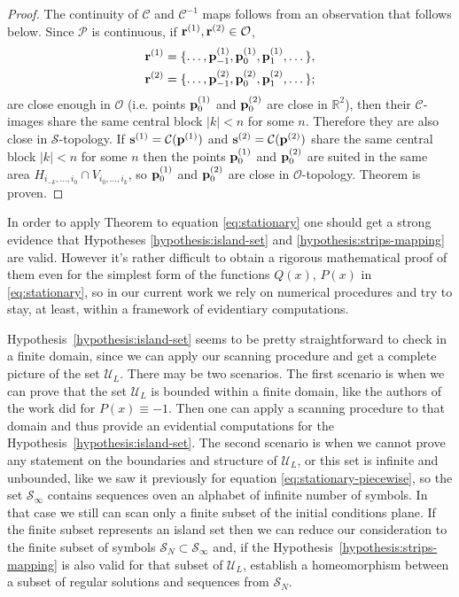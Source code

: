 \begin{proof}
	The continuity of $\mathcal{C}$ and $\mathcal{C}^{-1}$ maps follows from an observation that follows below.
	Since $\mathcal{P}$ is continuous, if $\vb{r}^{(1)}, \vb{r}^{(2)} \in \mathcal{O}$,
	\begin{eqnarray*}
		& \vb{r}^{(1)} = \{ \dots, \vb{p}_{-1}^{(1)}, \vb{p}_0^{(1)}, \vb{p}_1^{(1)}, \dots \}, \\
		& \vb{r}^{(2)} = \{ \dots, \vb{p}_{-1}^{(2)}, \vb{p}_0^{(2)}, \vb{p}_1^{(2)}, \dots \};
	\end{eqnarray*}
	are close enough in $\mathcal{O}$ (i.e. points $\vb{p}_0^{(1)}$ and $\vb{p}_0^{(2)}$ are close in $\mathbb{R}^2$), then their $\mathcal{C}$-images share the same central block $|k| < n$ for some $n$.
	Therefore they are also close in $\mathcal{S}$-topology.
	If $\vb{s}^{(1)} = \mathcal{C}(\vb{p}^{(1)})$ and $\vb{s}^{(2)} = \mathcal{C}(\vb{p}^{(2)})$ share the same central block $|k| < n$ for some $n$ then the points $\vb{p}_0^{(1)}$ and $\vb{p}_0^{(2)}$ are suited in the same area $H_{i_{-k}, \dots, i_0} \cap V_{i_0, \dots, i_k}$, so $\vb{p}_0^{(1)}$ and $\vb{p}_0^{(2)}$ are close in $\mathcal{O}$-topology.
	Theorem is proven.
\end{proof}

In order to apply Theorem to equation \eqref{eq:stationary} one should get a strong evidence that Hypotheses \ref{hypothesis:island-set} and \ref{hypothesis:strips-mapping} are valid.
However it's rather difficult to obtain a rigorous mathematical proof of them even for the simplest form of the functions $Q(x)$, $P(x)$ in \eqref{eq:stationary}, so in our current work we rely on numerical procedures and try to stay, at least, within a framework of evidentiary computations.

Hypothesis~\ref{hypothesis:island-set} seems to be pretty straightforward to check in a finite domain, since we can apply our scanning procedure and get a complete picture of the set $\mathscr{U}_L$.
There may be two scenarios.
The first scenario is when we can prove that the set $\mathscr{U}_L$ is bounded within a finite domain, like the authors of the work \cite{AlfimovAvramenko} did for $P(x) \equiv -1$.
Then one can apply a scanning procedure to that domain and thus provide an evidential computations for the Hypothesis~\ref{hypothesis:island-set}.
The second scenario is when we cannot prove any statement on the boundaries and structure of $\mathscr{U}_L$, or this set is infinite and unbounded, like we saw it previously for equation \eqref{eq:stationary-piecewise}, so the set $\mathcal{S}_{\infty}$ contains sequences oven an alphabet of infinite number of symbols.
In that case we still can scan only a finite subset of the initial conditions plane.
If the finite subset represents an island set then we can reduce our consideration to the finite subset of symbols $\mathcal{S}_N \subset \mathcal{S}_{\infty}$ and, if the Hypothesis~\ref{hypothesis:strips-mapping} is also valid for that subset of $\mathscr{U}_L$, establish a homeomorphism between a subset of regular solutions and sequences from $\mathcal{S}_N$.

